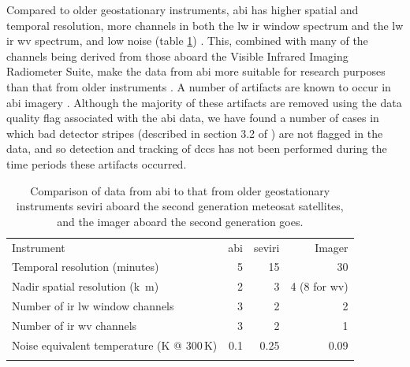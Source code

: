 Compared to older geostationary instruments, \acrshort{abi} has higher spatial and temporal resolution, more channels in both the \acrshort{lw} \acrshort{ir} window spectrum and the \acrshort{lw} \acrshort{ir} \acrshort{wv} spectrum, and low noise (table \ref{table:abi_comparison}) \citep{iacovazzi_goes-16_2020}.
This, combined with many of the channels being derived from those aboard the Visible Infrared Imaging Radiometer Suite, make the data from \acrshort{abi} more suitable for research purposes than that from older instruments \citep{heidinger_chapter_2020}.
A number of artifacts are known to occur in \acrshort{abi} imagery \citep{gunshor_goes-r_2020}.
Although the majority of these artifacts are removed using the data quality flag associated with the \acrshort{abi} data, we have found a number of cases in which bad detector stripes (described in section 3.2 of \citealp{gunshor_goes-r_2020}) are not flagged in the data, and so detection and tracking of \acrshort{dcc}s has not been performed during the time periods these artifacts occurred.


\begin{table}[tb]
\centering
\begin{tabular}{lrrr}
\tophline
Instrument                                              & \acrshort{abi}   & \acrshort{seviri}    & Imager \\
\middlehline
Temporal resolution (\unit{minutes})                    & 5     & 15        & 30 \\
Nadir spatial resolution (\unit{k m})                   & 2     & 3         & 4 (8 for \acrshort{wv}) \\
Number of \acrshort{ir} \acrshort{lw} window channels                         & 3     & 2         & 2 \\
Number of \acrshort{ir} \acrshort{wv} channels                                & 3     & 2         & 1 \\
Noise equivalent temperature  (\unit{K} @ 300\,\unit{K})  & 0.1   & 0.25      & 0.09 \\
\bottomhline
\end{tabular}
\caption[
Comparison of data from \acrshort{abi} to that from older geostationary instruments
]{
Comparison of data from \acrshort{abi} to that from older geostationary instruments\; \acrshort{seviri} aboard the second generation meteosat satellites, and the imager aboard the second generation \acrshort{goes}.
} %
\label{table:abi_comparison}
\end{table}


